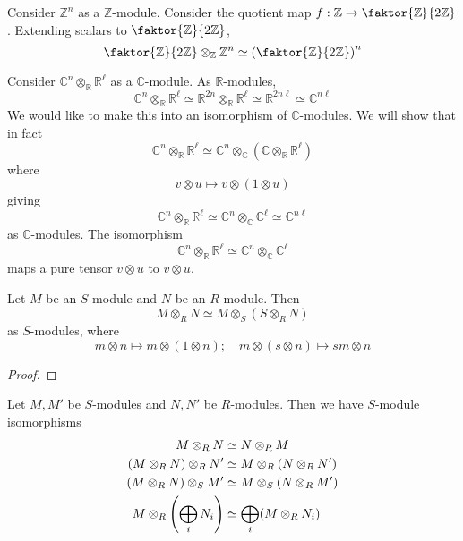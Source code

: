 \begin{example}
    Consider \( \mathbb Z^n \) as a \( \mathbb Z \)-module.
    Consider the quotient map \( f : \mathbb Z \to \faktor{\mathbb Z}{2\mathbb Z} \).
    Extending scalars to \( \faktor{\mathbb Z}{2\mathbb Z} \),
    \[ \faktor{\mathbb Z}{2\mathbb Z} \otimes_{\mathbb Z} \mathbb Z^n \simeq \qty(\faktor{\mathbb Z}{2\mathbb Z})^n \]
\end{example}
\begin{example}
    Consider \( \mathbb C^n \otimes_{\mathbb R} \mathbb R^\ell \) as a \( \mathbb C \)-module.
    As \( \mathbb R \)-modules,
    \[ \mathbb C^n \otimes_{\mathbb R} \mathbb R^\ell \simeq \mathbb R^{2n} \otimes_{\mathbb R} \mathbb R^\ell \simeq \mathbb R^{2n\ell} \simeq \mathbb C^{n\ell} \]
    We would like to make this into an isomorphism of \( \mathbb C \)-modules.
    We will show that in fact
    \[ \mathbb C^n \otimes_{\mathbb R} \mathbb R^\ell \simeq \mathbb C^n \otimes_{\mathbb C} (\mathbb C \otimes_{\mathbb R} \mathbb R^\ell) \]
    where
    \[ v \otimes u \mapsto v \otimes (1 \otimes u) \]
    giving
    \[ \mathbb C^n \otimes_{\mathbb R} \mathbb R^\ell \simeq \mathbb C^n \otimes_{\mathbb C} \mathbb C^\ell \simeq \mathbb C^{n\ell} \]
    as \( \mathbb C \)-modules.
    The isomorphism
    \[ \mathbb C^n \otimes_{\mathbb R} \mathbb R^\ell \simeq \mathbb C^n \otimes_{\mathbb C} \mathbb C^\ell \]
    maps a pure tensor \( v \otimes u \) to \( v \otimes u \).
\end{example}
\begin{proposition}
    Let \( M \) be an \( S \)-module and \( N \) be an \( R \)-module.
    Then
    \[ M \otimes_R N \simeq M \otimes_S (S \otimes_R N) \]
    as \( S \)-modules, where
    \[ m \otimes n \mapsto m \otimes (1 \otimes n);\quad m \otimes (s \otimes n) \mapsto sm \otimes n \]
\end{proposition}
\begin{proof}
\end{proof}
\begin{proposition}
    Let \( M, M' \) be \( S \)-modules and \( N, N' \) be \( R \)-modules.
    Then we have \( S \)-module isomorphisms
    \begin{align*}
        M \otimes_R N &\simeq N \otimes_R M \\
        (M \otimes_R N) \otimes_R N' &\simeq M \otimes_R (N \otimes_R N') \\
        (M \otimes_R N) \otimes_S M' &\simeq M \otimes_S (N \otimes_R M') \\
        M \otimes_R \qty(\bigoplus_i N_i) &\simeq \bigoplus_i (M \otimes_R N_i)
    \end{align*}
\end{proposition}
